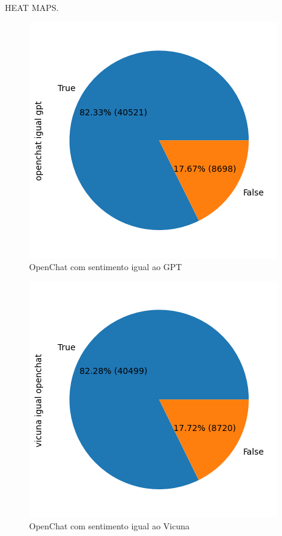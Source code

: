 HEAT MAPS.

\begin{figure}
	\centering
	\includegraphics{figs/openchat/vs_gpt.png}
	\caption{OpenChat com sentimento igual ao GPT}
	\label{img:openchat_vs_gpt}
\end{figure}

\begin{figure}
	\centering
	\includegraphics{figs/openchat/vs_vicuna.png}
	\caption{OpenChat com sentimento igual ao Vicuna}
	\label{img:openchat_vs_vicuna}
\end{figure}

